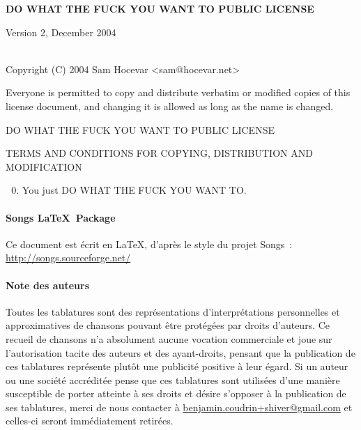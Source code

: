 \begin{center} 
  \textbf{\LARGE{DO WHAT THE FUCK YOU WANT TO PUBLIC LICENSE}}

    Version 2, December 2004

~\\

Copyright (C) 2004 Sam Hocevar <sam@hocevar.net> 
\end{center}
\vspace{1cm}

\begin{lblock}
   Everyone is permitted to copy and distribute verbatim or modified 
 copies of this license document, and changing it is allowed as long 
 as the name is changed. 
\end{lblock}
\begin{lblock}
\centering

DO WHAT THE FUCK YOU WANT TO PUBLIC LICENSE 

TERMS AND CONDITIONS FOR COPYING, DISTRIBUTION AND MODIFICATION

\begin{enumerate}
\setcounter{enumi}{-1}
\item You just DO WHAT THE FUCK YOU WANT TO.
\end{enumerate}
\end{lblock}
\paragraph{Songs \LaTeX~Package}
Ce document est écrit en \LaTeX, d'après le style du projet Songs~:
\url{http://songs.sourceforge.net/}

\paragraph{Note des auteurs}
Toutes les tablatures sont des représentations d'interprétations
personnelles et approximatives de chansons pouvant être protégées par droits
d'auteurs. Ce recueil de chansons n'a absolument aucune vocation
commerciale et joue sur l'autorisation tacite des auteurs et des
ayant-droits, pensant que la publication de ces tablatures représente
plutôt une publicité positive à leur égard. Si un auteur ou une
société accréditée pense que ces tablatures sont utilisées d'une
manière susceptible de porter atteinte à ses droits et désire
s'opposer à la publication de ses tablatures, merci de nous contacter
à \url{benjamin.coudrin+shiver@gmail.com} et celles-ci seront immédiatement
retirées.
